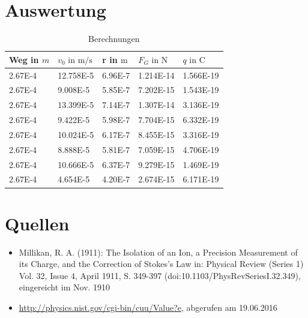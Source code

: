 \documentclass[a4paper,12pt,fleqn,oneside]{article}
\begin{document}
\newpage
\section{Auswertung}

	\begin{table}[h!]
	\centering
	\begin{tabular}{@{}lllll@{}}
		\toprule
		Weg in $m$	& $v_{0} \text{ in }\si{\meter\per\second}$	& r in $\si{\metre}$	& $F_{G} \text{ in }\si{\newton}$	& $q \text{ in }\si{\coulomb}$	\\ \midrule
		\num{2.67E-4}	& \num{12.758E-5}				& \num{6.96E-7}		& \num{1.214E-14}			& \num{1.566E-19}		\\
		\num{2.67E-4}	& \num{9.008E-5}				& \num{5.85E-7}		& \num{7.202E-15}			& \num{1.543E-19}		\\
		\num{2.67E-4}	& \num{13.399E-5}				& \num{7.14E-7}		& \num{1.307E-14}			& \num{3.136E-19}		\\
		\num{2.67E-4}	& \num{9.422E-5}				& \num{5.98E-7}		& \num{7.704E-15}			& \num{6.332E-19}		\\
		\num{2.67E-4}	& \num{10.024E-5}				& \num{6.17E-7}		& \num{8.455E-15}			& \num{3.316E-19}		\\
		\num{2.67E-4}	& \num{8.888E-5}				& \num{5.81E-7}		& \num{7.059E-15}			& \num{4.706E-19}		\\
		\num{2.67E-4}	& \num{10.666E-5}				& \num{6.37E-7}		& \num{9.279E-15}			& \num{1.469E-19}		\\
		\num{2.67E-4}	& \num{4.654E-5}				& \num{4.20E-7}		& \num{2.674E-15}			& \num{6.171E-19}		\\ \bottomrule
		\end{tabular}
	\caption{Berechnungen}
	\label{tab:berechnungen}
	\end{table}




\newpage
\section{Quellen}
	\begin{itemize}
		\item Millikan, R. A. (1911): The Isolation of an Ion, a Precision Measurement of its Charge, and the Correction of Stokes's
			 Law in: Physical Review (Series 1) Vol. 32, Issue 4, April 1911, S. 349-397 (doi:10.1103/PhysRevSeriesI.32.349),
			 eingereicht im Nov. 1910
		\item \url{http://physics.nist.gov/cgi-bin/cuu/Value?e}, abgerufen am 19.06.2016
	\end{itemize}
\end{document}
